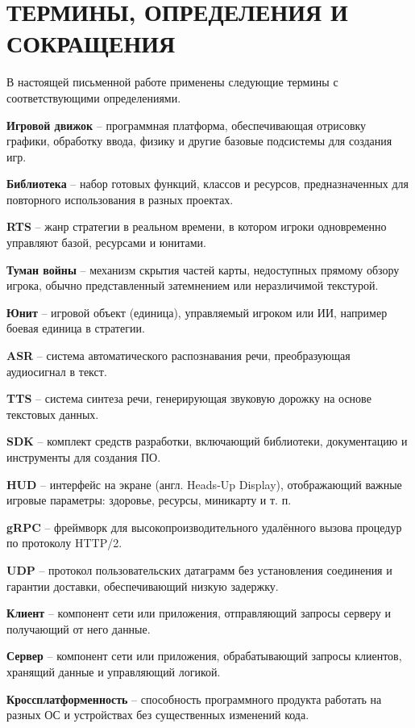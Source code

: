 \section*{ТЕРМИНЫ, ОПРЕДЕЛЕНИЯ И СОКРАЩЕНИЯ}
В настоящей письменной работе применены следующие термины с
соответствующими определениями.

\textbf{Игровой движок} -- программная платформа, обеспечивающая отрисовку графики, обработку ввода, физику и другие базовые подсистемы для создания игр.

\textbf{Библиотека} -- набор готовых функций, классов и ресурсов, предназначенных для повторного использования в разных проектах.

\textbf{RTS} -- жанр стратегии в реальном времени, в котором игроки одновременно управляют базой, ресурсами и юнитами.

\textbf{Туман войны} -- механизм скрытия частей карты, недоступных прямому обзору игрока, обычно представленный затемнением или неразличимой текстурой.

\textbf{Юнит} -- игровой объект (единица), управляемый игроком или ИИ, например боевая единица в стратегии.

\textbf{ASR} -- система автоматического распознавания речи, преобразующая аудиосигнал в текст.

\textbf{TTS} -- система синтеза речи, генерирующая звуковую дорожку на основе текстовых данных.

\textbf{SDK} -- комплект средств разработки, включающий библиотеки, документацию и инструменты для создания ПО.

\textbf{HUD} -- интерфейс на экране (англ. Heads-Up Display), отображающий важные игровые параметры: здоровье, ресурсы, миникарту и т. п.

\textbf{gRPC} -- фреймворк для высокопроизводительного удалённого вызова процедур по протоколу HTTP/2.

\textbf{UDP} -- протокол пользовательских датаграмм без установления соединения и гарантии доставки, обеспечивающий низкую задержку.

\textbf{Клиент} -- компонент сети или приложения, отправляющий запросы серверу и получающий от него данные.

\textbf{Сервер} -- компонент сети или приложения, обрабатывающий запросы клиентов, хранящий данные и управляющий логикой.

\textbf{Кроссплатформенность} -- способность программного продукта работать на разных ОС и устройствах без существенных изменений кода.

